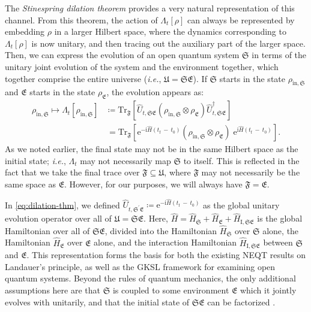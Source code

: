 \documentclass[preprints,article,accept,moreauthors,pdftex]{Definitions/mdpi}
\begin{document}
\begin{paracol}{2}
The \emph{Stinespring dilation theorem} \cite{Stinespring55} provides a very natural representation of this channel. From this theorem, the action of $\Lambda_{t}\left[\rho\right]$ can always be represented by embedding $\rho$ in a larger Hilbert space, where the dynamics corresponding to $\Lambda_{t}\left[\rho\right]$ is now unitary, and then tracing out the auxiliary part of the larger space. Then, we can express the evolution of an open quantum system $\mathfrak{S}$ in terms of the unitary joint evolution of the system and the environment together, which together comprise the entire universe (\emph{i.e.}, $\mathfrak{U} = \mathfrak{SE}$). If $\mathfrak{S}$ starts in the state $\rho_{\mathrm{in},\mathfrak{S}}$ and $\mathfrak{E}$ starts in the state $\rho_{\mathfrak{E}}$, the evolution appears as:
\begin{equation}
    \label{eq:dilation-thm}
    \begin{split}
        \rho_{\mathrm{in},\mathfrak{S}} \mapsto \Lambda_{t}\left[\rho_{\mathrm{in},\mathfrak{S}}\right] &\coloneqq \mathrm{Tr}_{\mathfrak{F}}\left[\widehat{U}_{t,\mathfrak{SE}}\left(\rho_{\mathrm{in},\mathfrak{S}}\otimes\rho_{\mathfrak{E}}\right)\widehat{U}_{t,\mathfrak{SE}}^{\dagger}\right] \\[4pt]
        &\,= \mathrm{Tr}_{\mathfrak{F}}\left[\mathrm{e}^{-\mathrm{i}\widehat{H}\left(t_\mathrm{f}\:-\:t_{0}\right)}\left(\rho_{\mathrm{in},\mathfrak{S}}\otimes\rho_{\mathfrak{E}}\right)\;\!\mathrm{e}^{\mathrm{i}\widehat{H}\left(t_\mathrm{f}\:-\:t_{0}\right)}\right].
    \end{split}
\end{equation}
As we noted earlier, the final state may not be in the same Hilbert space as the initial state; \emph{i.e.}, $\Lambda_{t}$ may not necessarily map $\mathfrak{S}$ to itself. This is reflected in the fact that we take the final trace over $\mathfrak{F}\subseteq\mathfrak{U}$, where $\mathfrak{F}$ may not necessarily be the same space as $\mathfrak{E}$. However, for our purposes, we will always have $\mathfrak{F} = \mathfrak{E}$.

In \eqref{eq:dilation-thm}, we defined $\widehat{U}_{t,\mathfrak{S^\prime E}} \coloneqq \mathrm{e}^{-\mathrm{i}\widehat{H}\left(t_\mathrm{f}\:-\:t_{0}\right)}$ as the global unitary evolution operator over all of $\mathfrak{U} = \mathfrak{SE}$. Here, $\widehat{H} = \widehat{H}_{\mathfrak{S}} + \widehat{H}_{\mathfrak{E}} + \widehat{H}_{\mathrm{I},\mathfrak{SE}}$ is the global Hamiltonian over all of $\mathfrak{SE}$, divided into the Hamiltonian $\widehat{H}_{\mathfrak{S}}$ over $\mathfrak{S}$ alone, the Hamiltonian $\widehat{H}_{\mathfrak{E}}$ over $\mathfrak{E}$ alone, and the interaction Hamiltonian $\widehat{H}_{\mathrm{I},\mathfrak{SE}}$ between $\mathfrak{S}$ and $\mathfrak{E}$. This representation forms the basis for both the existing NEQT results on Landauer's principle, as well as the GKSL framework for examining open quantum systems. Beyond the rules of quantum mechanics, the only additional assumptions here are that $\mathfrak{S}$ is coupled to some environment $\mathfrak{E}$ which it jointly evolves with unitarily, and that the initial state of $\mathfrak{SE}$ can be factorized \cite{Pechukas94}.


\end{paracol}
\end{document}
